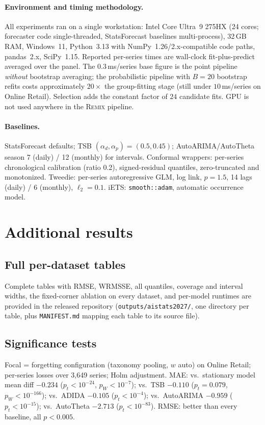 \documentclass[twocolumn,10pt]{article}
\newcommand{\REMIX}{\textsc{Remix}}
\begin{document}
\paragraph{Environment and timing methodology.} All experiments ran on a
single workstation: Intel Core Ultra~9 275HX (24 cores; forecaster code
single-threaded, StatsForecast baselines multi-process), 32\,GB RAM,
Windows~11, Python~3.13 with NumPy~1.26/2.x-compatible code paths,
pandas~2.x, SciPy~1.15. Reported per-series times are wall-clock
fit-plus-predict averaged over the panel. The $0.3$\,ms/series base
figure is the point pipeline \emph{without} bootstrap averaging; the
probabilistic pipeline with $B{=}20$ bootstrap refits costs
approximately $20\times$ the group-fitting stage (still under
$10$\,ms/series on Online Retail). Selection adds the constant factor of
$24$ candidate fits. GPU is not used anywhere in the \REMIX{} pipeline.

\paragraph{Baselines.} StatsForecast defaults; TSB
$(\alpha_d,\alpha_p)=(0.5,0.45)$; AutoARIMA/AutoTheta season 7 (daily) /
12 (monthly) for intervals. Conformal wrappers: per-series chronological
calibration (ratio 0.2), signed-residual quantiles, zero-truncated and
monotonized. Tweedie: per-series autoregressive GLM, log link, $p{=}1.5$,
14 lags (daily) / 6 (monthly), $\ell_2{=}0.1$. iETS:
\texttt{smooth::adam}, automatic occurrence model.

\section{Additional results}\label{app:extra}

\subsection{Full per-dataset tables}
Complete tables with RMSE, WRMSSE, all quantiles, coverage and interval
widths, the fixed-corner ablation on every dataset, and per-model
runtimes are provided in the released repository
(\texttt{outputs/aistats2027/}, one directory per table, plus
\texttt{MANIFEST.md} mapping each table to its source file).

\subsection{Significance tests}
Focal = forgetting configuration (taxonomy pooling, $w$ auto) on Online
Retail; per-series losses over 3{,}649 series; Holm adjustment.
MAE: vs.\ stationary model mean diff $-0.234$ ($p_t<10^{-24}$,
$p_W<10^{-7}$); vs.\ TSB $-0.110$ ($p_t=0.079$, $p_W<10^{-166}$);
vs.\ ADIDA $-0.105$ ($p_t<10^{-4}$); vs.\ AutoARIMA $-0.959$
($p_t<10^{-15}$); vs.\ AutoTheta $-2.713$ ($p_t<10^{-83}$).
RMSE: better than every baseline, all $p<0.005$.
\end{document}
